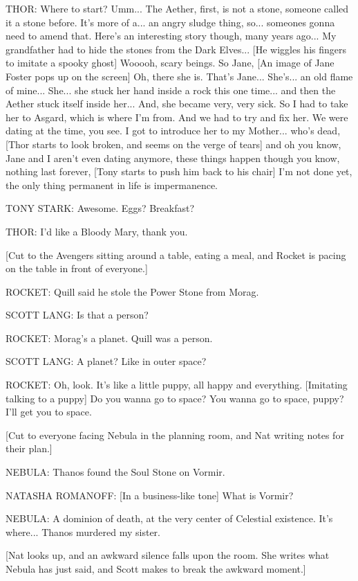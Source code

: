 THOR: Where to start? Umm... The Aether, first, is not a stone, someone called it a stone before. It's more of a... an angry sludge thing, so... someones gonna need to amend that. Here's an interesting story though, many years ago... My grandfather had to hide the stones from the Dark Elves... [He wiggles his fingers to imitate a spooky ghost] Wooooh, scary beings. So Jane, [An image of Jane Foster pops up on the screen] Oh, there she is. That's Jane... She's... an old flame of mine... She... she stuck her hand inside a rock this one time... and then the Aether stuck itself inside her... And, she became very, very sick. So I had to take her to Asgard, which is where I'm from. And we had to try and fix her. We were dating at the time, you see. I got to introduce her to my Mother... who's dead, [Thor starts to look broken, and seems on the verge of tears] and oh you know, Jane and I aren't even dating anymore, these things happen though you know, nothing last forever, [Tony starts to push him back to his chair] I'm not done yet, the only thing permanent in life is impermanence.

TONY STARK: Awesome. Eggs? Breakfast?

THOR: I'd like a Bloody Mary, thank you.

[Cut to the Avengers sitting around a table, eating a meal, and Rocket is pacing on the table in front of everyone.]

ROCKET: Quill said he stole the Power Stone from Morag.

SCOTT LANG: Is that a person?

ROCKET: Morag's a planet. Quill was a person.

SCOTT LANG: A planet? Like in outer space?

ROCKET: Oh, look. It's like a little puppy, all happy and everything. [Imitating talking to a puppy] Do you wanna go to space? You wanna go to space, puppy? I'll get you to space.

[Cut to everyone facing Nebula in the planning room, and Nat writing notes for their plan.]

NEBULA: Thanos found the Soul Stone on Vormir.

NATASHA ROMANOFF: [In a business-like tone] What is Vormir?

NEBULA: A dominion of death, at the very center of Celestial existence. It's where... Thanos murdered my sister.

[Nat looks up, and an awkward silence falls upon the room. She writes what Nebula has just said, and Scott makes to break the awkward moment.]

